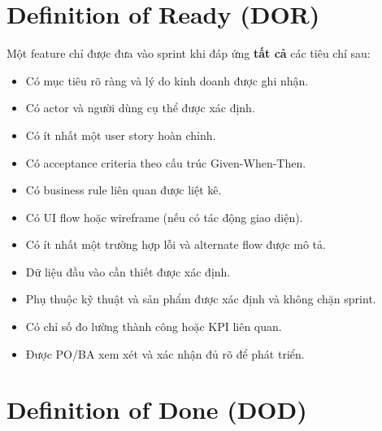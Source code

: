 \documentclass[12pt,a4paper]{article}
\begin{document}
\normalsize

\section{Definition of Ready (DOR)}

Một feature chỉ được đưa vào sprint khi đáp ứng \textbf{tất cả} các tiêu chí sau:
\begin{itemize}
  \item[$\square$] Có mục tiêu rõ ràng và lý do kinh doanh được ghi nhận.
  \item[$\square$] Có actor và người dùng cụ thể được xác định.
  \item[$\square$] Có ít nhất một user story hoàn chỉnh.
  \item[$\square$] Có acceptance criteria theo cấu trúc Given-When-Then.
  \item[$\square$] Có business rule liên quan được liệt kê.
  \item[$\square$] Có UI flow hoặc wireframe (nếu có tác động giao diện).
  \item[$\square$] Có ít nhất một trường hợp lỗi và alternate flow được mô tả.
  \item[$\square$] Dữ liệu đầu vào cần thiết được xác định.
  \item[$\square$] Phụ thuộc kỹ thuật và sản phẩm được xác định và không chặn sprint.
  \item[$\square$] Có chỉ số đo lường thành công hoặc KPI liên quan.
  \item[$\square$] Được PO/BA xem xét và xác nhận đủ rõ để phát triển.
\end{itemize}

\section{Definition of Done (DOD)}
\end{document}
